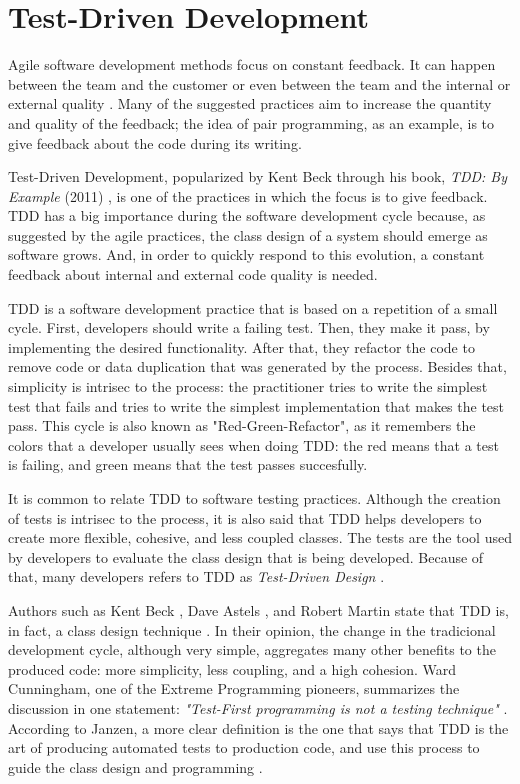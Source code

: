 \documentclass[conference]{IEEEtran}
\begin{document}
\section{Test-Driven Development}

Agile software development methods focus on constant feedback. It can happen
between the team and the customer or even between the team and the
internal or external quality \cite{AgileManifesto}. Many of the suggested practices
aim to increase the quantity and quality of the feedback; the idea of pair programming,
as an example, is to give feedback about the code during its writing.

Test-Driven Development, popularized by Kent Beck through his book, \textit{TDD: By Example} (2011)
\cite{TDDByExample}, is one of the practices in which the focus is to give feedback. TDD has
a big importance during the software development cycle because, as suggested by the agile
practices, the class design of a system should emerge as software grows. And, in order
to quickly respond to this evolution, a constant feedback about internal and external code
quality is needed.

TDD is a software development practice that is based on a repetition of a small
cycle. First, developers should write a failing test. Then, they make it pass,
by implementing the desired functionality. After that, they refactor the code
to remove code or data duplication that was generated by the process. Besides that,
simplicity is intrisec to the process: the practitioner tries to write the simplest
test that fails and tries to write the simplest implementation that makes the
test pass. This cycle is also known as "Red-Green-Refactor", as it remembers the
colors that a developer usually sees when doing TDD: the red means that a test
is failing, and green means that the test passes succesfully.

It is common to relate TDD to software testing practices. Although the creation
of tests is intrisec to the process, it is also said that TDD helps developers
to create more flexible, cohesive, and less coupled classes. The tests are the
tool used by developers to evaluate the class design that is being developed.
Because of that, many developers refers to TDD 
as \textit{Test-Driven Design} \cite{tdd-taxonomy}.

Authors such as Kent Beck \cite{aim-fire}, Dave Astels \cite{astels-tdd}, and
Robert Martin \cite{bob-martin} state that TDD is, in fact, a class design
technique \cite{tdd-taxonomy} \cite{aim-fire}.
In their opinion, the change in the tradicional development cycle, although very simple,
aggregates many other benefits to the produced code: more simplicity, less coupling, and
a high cohesion. Ward Cunningham, one of the Extreme Programming pioneers, summarizes
the discussion in one statement: \textit{"Test-First programming is not a testing technique"} 
\cite{aim-fire}.
According to Janzen, a more clear definition is the one that says that TDD is the 
art of producing automated tests to production code, and use this process to guide
the class design and programming \cite{agilealliance-tdd} \cite{tdd-taxonomy}.
\end{document}
